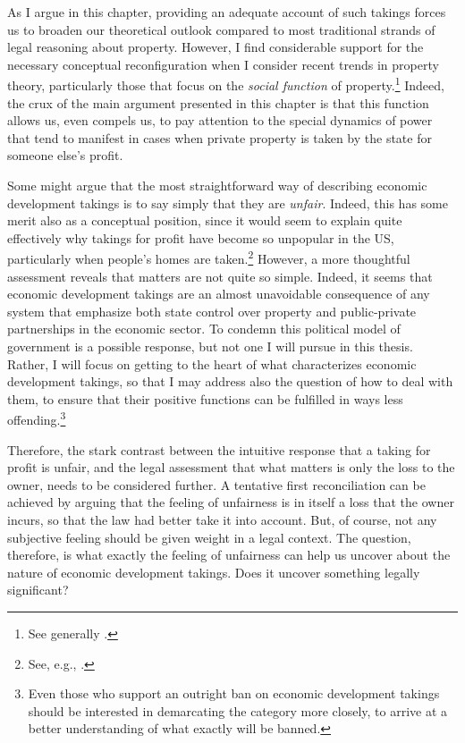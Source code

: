 As I argue in this chapter, providing an adequate account of such takings forces us to broaden our theoretical outlook compared to most traditional strands of legal reasoning about property. However, I find considerable support for the necessary conceptual reconfiguration when I consider recent trends in property theory, particularly those that focus on the {\it social function} of property.\footnote{See generally \cite{alexander09a,foster11,singer00,underkuffler03,alexander06,alexander10,dagan11}.} Indeed, the crux of the main argument presented in this chapter is that this function allows us, even compels us, to pay attention to the special dynamics of power that tend to manifest in cases when private property is taken by the state for someone else's profit.

Some might argue that the most straightforward way of describing economic development takings is to say simply that they are {\it unfair}. Indeed, this has some merit also as a conceptual position, since it would seem to explain quite effectively why takings for profit have become so unpopular in the US, particularly when people's homes are taken.\footnote{See, e.g., \cite[742-748]{nadler08}.}  However, a more thoughtful assessment reveals that matters are not quite so simple. Indeed, it seems that economic development takings are an almost unavoidable consequence of any system that emphasize both state control over property and public-private partnerships in the economic sector. To condemn this political model of government is a possible response, but not one I will pursue in this thesis. Rather, I will focus on getting to the heart of what characterizes economic development takings, so that I may address also the question of how to deal with them, to ensure that their positive functions can be fulfilled in ways less offending.\footnote{Even those who support an outright ban on economic development takings should be interested in demarcating the category more closely, to arrive at a better understanding of what exactly will be banned.}

Therefore, the stark contrast between the intuitive response that a taking for profit is unfair, and the legal assessment that what matters is only the loss to the owner, needs to be considered further. A tentative first reconciliation can be achieved by arguing that the feeling of unfairness is in itself a loss that the owner incurs, so that the law had better take it into account. But, of course, not any subjective feeling should be given weight in a legal context. The question, therefore, is what exactly the feeling of unfairness can help us uncover about the nature of economic development takings. Does it uncover something legally significant?

